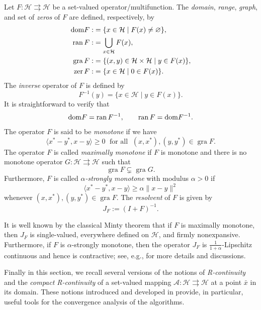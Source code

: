 \documentclass[12pt]{article}
\theoremstyle{plain}
\newcommand\dom{{\rm dom}}%
\newcommand{\gra }{\operatorname{gra}}
\newcommand{\ran }{\operatorname{ran}}
\newcommand{\zer}{\operatorname{zer}}
\begin{document}
Let $F:\mathcal{H}\rightrightarrows \mathcal{H}$ be a set-valued operator/multifunction. The {\it domain}, {\it range}, {\it graph}, and set of {\it zeros} of $F$ are defined, respectively, by
\begin{align*}
\dom F: &= \{x\in\mathcal{H}\;|\;F(x)\neq\varnothing\},\\
\ran F: &= \bigcup_{x\in\mathcal{H}}F(x),\\
\gra F: &= \{(x,y)\in\mathcal{H}\times\mathcal{H}\;|\;y\in F(x)\},\\
\zer F: &= \{x\in\mathcal{H}\;|\;0\in F(x)\}.
\end{align*}
The {\it inverse} operator of $F$ is defined by
\[
F^{-1}(y)=\{x\in\mathcal{H}\;|\;y\in F(x)\}.
\]
It is straightforward to verify that
\[
\dom F=\ran F^{-1},
\qquad
\ran F=\dom F^{-1}.
\]
The operator $F$ is said to be {\it monotone} if we have
\[
\langle x^*-y^*,x-y\rangle\geq 0\;\mbox{ for all }\;(x,x^*),(y,y^*)\in\gra F.
\]
The operator \(F\) is called {\it maximally monotone}
if \(F\) is monotone and  there is no monotone operator
$G :\mathcal{H}\rightrightarrows \mathcal{H} $ such that
\[
\operatorname{gra} F \subsetneq \operatorname{gra} G.
\]
Furthermore, $F$ is called {\it $\alpha$-strongly monotone} with modulus $\alpha>0$ if
\[
\langle x^*-y^*,x-y\rangle
\geq \alpha\|x-y\|^2
\]
whenever $(x,x^*),(y,y^*)\in\gra F$. The {\it resolvent} of $F$ is given by
\[
J_F:=(I+F)^{-1}.
\]

It is well known by the classical Minty theorem that if $F$ is maximally monotone, then $J_F$ is single-valued, everywhere defined on $\mathcal{H}$, and firmly nonexpansive. Furthermore, if $F$ is $\alpha$-strongly monotone, then the operator $J_F$ is $\frac{1}{1+\alpha}$-Lipschitz continuous and hence is contractive; see, e.g., 
\cite{Bauschke,Nesterov,Reich1,Rockafellar} for more details and discussions. 

Finally in this section, we recall several versions of the notions of {\it R-continuity} and the {\it compact  R-continuity} of a set-valued mapping $\mathcal{A}:\mathcal{H} \rightrightarrows \mathcal{H}$ at a point ${\bar x}$ in its domain. These notions introduced and developed in  \cite{L1,LMT,LT} provide, in particular, useful tools for the convergence analysis of the  algorithms. 
\end{document}
